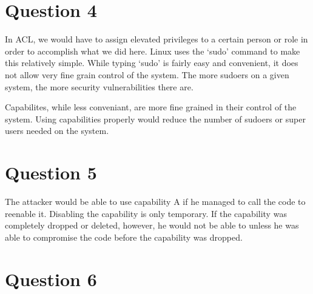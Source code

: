 \documentclass[10pt,letterpaper]{article}
\begin{document}
\section*{Question 4}
In ACL, we would have to assign elevated privileges to a certain person or
role in order to accomplish what we did here. Linux uses the `sudo' command
to make this relatively simple. While typing `sudo' is fairly easy and convenient,
it does not allow very fine grain control of the system. The more sudoers on a
given system, the more security vulnerabilities there are.

Capabilites, while less conveniant, are more fine grained in their control of
the system. Using capabilities properly would reduce the number of sudoers or
super users needed on the system.

\section*{Question 5}
The attacker would be able to use capability A if he managed to call the code
to reenable it. Disabling the capability is only temporary.
If the capability was completely dropped or deleted, however, he would not be
able to unless he was able to compromise the code before the capability was
dropped.

\section*{Question 6}
\end{document}
